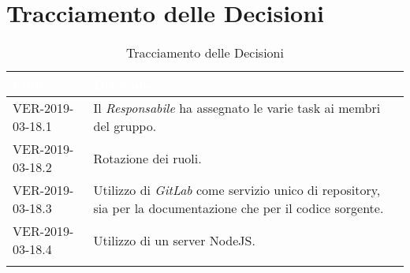 \newpage
\section{Tracciamento delle Decisioni}

\begin{longtable}{|C{.40\textwidth}|C{.60\textwidth}|}
\hline
{}\textbf{\textcolor{white}{Codice}} & \textbf{\textcolor{white}{Decisione}}\\
\hline
VER-2019-03-18.1 & Il \textit{Responsabile} ha assegnato le varie task ai membri del gruppo. \\
\hline
{}VER-2019-03-18.2 & Rotazione dei ruoli. \\
\hline
VER-2019-03-18.3 & Utilizzo di \textit{GitLab} come servizio unico di repository, sia per la documentazione che per il codice sorgente. \\
\hline
{}VER-2019-03-18.4 & Utilizzo di un server NodeJS. \\
\hline

\caption{Tracciamento delle Decisioni}
\end{longtable}
